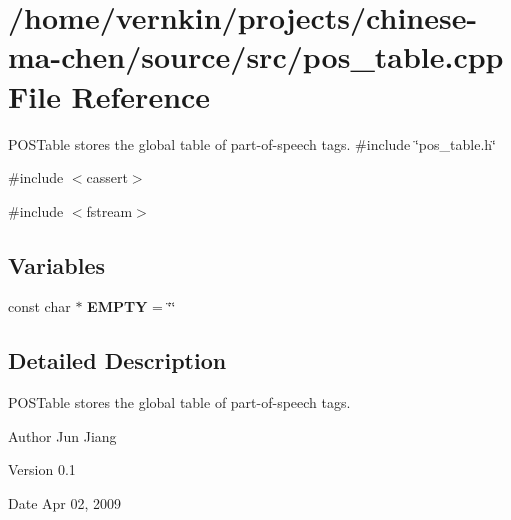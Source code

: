 \section{/home/vernkin/projects/chinese-\/ma-\/chen/source/src/pos\_\-table.cpp File Reference}
\label{pos__table_8cpp}


POSTable stores the global table of part-\/of-\/speech tags.  
{\ttfamily \#include \char`\"{}pos\_\-table.h\char`\"{}}\par
{\ttfamily \#include $<$cassert$>$}\par
{\ttfamily \#include $<$fstream$>$}\par
\subsection*{Variables}
\begin{DoxyCompactItemize}
\item 
const char $\ast$ {\bfseries EMPTY} = \char`\"{}\char`\"{}\label{pos__table_8cpp_ad7f4cc3faf0602bfdba8969c757d21e0}

\end{DoxyCompactItemize}


\subsection{Detailed Description}
POSTable stores the global table of part-\/of-\/speech tags. \begin{DoxyAuthor}{Author}
Jun Jiang 
\end{DoxyAuthor}
\begin{DoxyVersion}{Version}
0.1 
\end{DoxyVersion}
\begin{DoxyDate}{Date}
Apr 02, 2009 
\end{DoxyDate}

